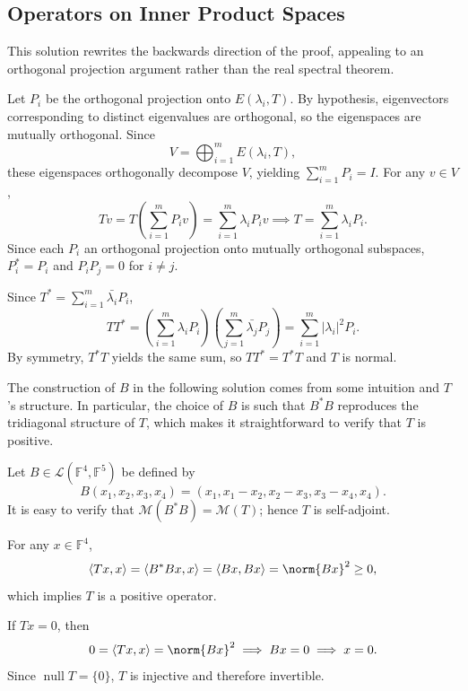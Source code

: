 \subsection{Operators on Inner Product Spaces}


This solution rewrites the backwards direction of the proof, appealing to an orthogonal projection argument rather than the real spectral theorem.

\begin{csp}
    Let $P_i$ be the orthogonal projection onto $E(\lambda_i, T)$.
    By hypothesis, eigenvectors corresponding to distinct eigenvalues are orthogonal, so the eigenspaces are mutually orthogonal.
    Since
    \[
        V = \bigoplus_{i=1}^m E(\lambda_i, T),
    \]
    these eigenspaces orthogonally decompose $V$, yielding $\sum_{i=1}^m P_i = I$.
    For any $v \in V$,
    \[
        T v = T\left(\sum_{i=1}^m P_i v\right) = \sum_{i=1}^m \lambda_i P_i v \implies T = \sum_{i=1}^m \lambda_i P_i.
    \]
    Since each $P_i$ an orthogonal projection onto mutually orthogonal subspaces, $P_i^\ast = P_i$ and $P_i P_j = 0$ for $i \neq j$.
\end{csp}


\begin{csp}
    Since $T^\ast = \sum_{i=1}^m \bar{\lambda_i} P_i$,
    \[
        TT^\ast = \left(\sum_{i=1}^m \lambda_i P_i\right)\left(\sum_{j=1}^m \bar{\lambda_j} P_j\right) = \sum_{i=1}^m |\lambda_i|^2 P_i.
    \]
    By symmetry, $T^\ast T$ yields the same sum, so $TT^\ast = T^\ast T$ and $T$ is normal.
\end{csp}


The construction of $B$ in the following solution comes from some intuition and $T$'s structure.
In particular, the choice of $B$ is such that $B^\ast B$ reproduces the tridiagonal structure of $T$, which makes it straightforward to verify that $T$ is positive.

\begin{csp}
    Let $B \in \mathcal{L}\left(\mathbb{F}^4, \mathbb{F}^5\right)$ be defined by
    $$B(x_1,x_2,x_3,x_4)=(x_1,x_1-x_2,x_2-x_3,x_3-x_4,x_4).$$
    It is easy to verify that $\mathcal{M}(B^{\ast}B)=\mathcal{M}(T)$; hence $T$ is self-adjoint.

    For any $x \in \mathbb{F}^4$,
    $$\langle Tx,x \rangle=\langle B^{\ast}Bx, x \rangle=\langle Bx,Bx \rangle=\norm{Bx}^2 \geq 0,$$
    which implies $T$ is a positive operator.

    If $Tx=0$, then
    $$0=\langle Tx,x \rangle=\norm{Bx}^2 \implies Bx=0 \implies x=0.$$
    Since $\operatorname{null} T=\{0\}$, $T$ is injective and therefore invertible.
\end{csp}

